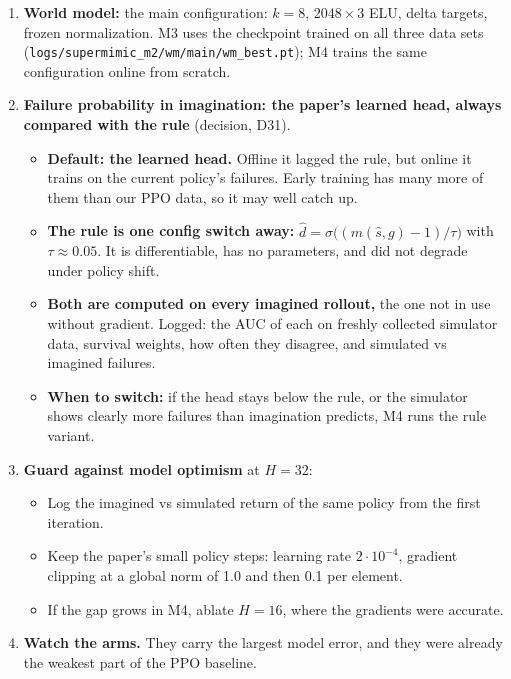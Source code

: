 \documentclass[10pt]{article}
\begin{document}
\begin{enumerate}
  \item \textbf{World model:} the main configuration: $k = 8$, $2048{\times}3$ ELU, delta targets,
  frozen normalization. M3 uses the checkpoint trained on all three data sets
  (\texttt{logs/supermimic\_m2/wm/main/wm\_best.pt}); M4 trains the same configuration online from
  scratch.
  \item \textbf{Failure probability in imagination: the paper's learned head, always compared with the
  rule} (decision, D31).
  \begin{itemize}
    \item \textbf{Default: the learned head.} Offline it lagged the rule, but online it trains on the
    current policy's failures. Early training has many more of them than our PPO data, so it may well
    catch up.
    \item \textbf{The rule is one config switch away:} $\hat d = \sigma\big((m(\hat s, g) - 1)/\tau\big)$
    with $\tau \approx 0.05$. It is differentiable, has no parameters, and did not degrade under policy
    shift.
    \item \textbf{Both are computed on every imagined rollout,} the one not in use without gradient.
    Logged: the AUC of each on freshly collected simulator data, survival weights, how often they
    disagree, and simulated vs imagined failures.
    \item \textbf{When to switch:} if the head stays below the rule, or the simulator shows clearly more
    failures than imagination predicts, M4 runs the rule variant.
  \end{itemize}
  \item \textbf{Guard against model optimism} at $H = 32$:
  \begin{itemize}
    \item Log the imagined vs simulated return of the same policy from the first iteration.
    \item Keep the paper's small policy steps: learning rate $2\cdot10^{-4}$, gradient clipping at a
    global norm of 1.0 and then 0.1 per element.
    \item If the gap grows in M4, ablate $H = 16$, where the gradients were accurate.
  \end{itemize}
  \item \textbf{Watch the arms.} They carry the largest model error, and they were already the weakest
  part of the PPO baseline.
\end{enumerate}
\end{document}
